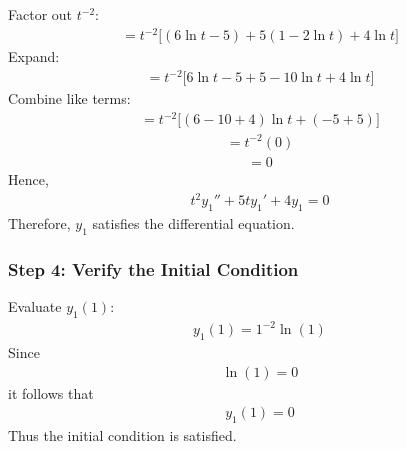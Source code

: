 \documentclass[letterpaper,10pt,english]{sphinxmanual}
\begin{document}
\sphinxAtStartPar
Factor out \(t^{-2}\):
\begin{equation*}
\begin{split}=
t^{-2}
\Big[
(6\ln t-5)
+5(1-2\ln t)
+4\ln t
\Big]\end{split}
\end{equation*}
\sphinxAtStartPar
Expand:
\begin{equation*}
\begin{split}=
t^{-2}
\Big[
6\ln t-5
+5
-10\ln t
+4\ln t
\Big]\end{split}
\end{equation*}
\sphinxAtStartPar
Combine like terms:
\begin{equation*}
\begin{split}=
t^{-2}
\Big[
(6-10+4)\ln t
+(-5+5)
\Big]\end{split}
\end{equation*}\begin{equation*}
\begin{split}=
t^{-2}(0)\end{split}
\end{equation*}\begin{equation*}
\begin{split}=0\end{split}
\end{equation*}
\sphinxAtStartPar
Hence,
\begin{equation*}
\begin{split}t^2y_1''+5ty_1'+4y_1=0\end{split}
\end{equation*}
\sphinxAtStartPar
Therefore, \(y_1\) satisfies the differential equation.


\subsubsection{Step 4: Verify the Initial Condition}
\label{\detokenize{Language/Science_language/ODE_calculus/course_MATH_3035/homework_assignments/index_pdf:step-4-verify-the-initial-condition}}
\sphinxAtStartPar
Evaluate \(y_1(1)\):
\begin{equation*}
\begin{split}y_1(1)
=
1^{-2}\ln(1)\end{split}
\end{equation*}
\sphinxAtStartPar
Since
\begin{equation*}
\begin{split}\ln(1)=0\end{split}
\end{equation*}
\sphinxAtStartPar
it follows that
\begin{equation*}
\begin{split}y_1(1)=0\end{split}
\end{equation*}
\sphinxAtStartPar
Thus the initial condition is satisfied.
\end{document}
